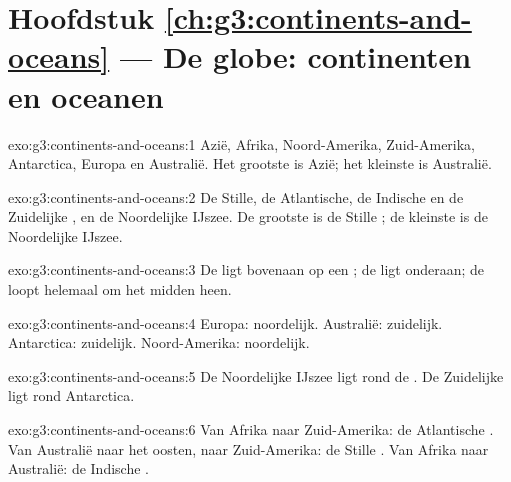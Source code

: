 \section*{Hoofdstuk \ref{ch:g3:continents-and-oceans} --- De globe: continenten en oceanen}

\begin{solution}{exo:g3:continents-and-oceans:1}
Azië, Afrika, Noord-Amerika, Zuid-Amerika, Antarctica, Europa en
Australië. Het grootste is Azië; het kleinste is Australië.
\end{solution}

\begin{solution}{exo:g3:continents-and-oceans:2}
De Stille, de Atlantische, de Indische en de Zuidelijke , en de
Noordelijke IJszee. De grootste is de Stille ; de kleinste is de
Noordelijke IJszee.
\end{solution}

\begin{solution}{exo:g3:continents-and-oceans:3}
De  ligt bovenaan op een ; de  ligt onderaan; de
 loopt helemaal om het midden heen.
\end{solution}

\begin{solution}{exo:g3:continents-and-oceans:4}
Europa: noordelijk. Australië: zuidelijk. Antarctica: zuidelijk.
Noord-Amerika: noordelijk.
\end{solution}

\begin{solution}{exo:g3:continents-and-oceans:5}
De Noordelijke IJszee ligt rond de . De Zuidelijke  ligt
rond Antarctica.
\end{solution}

\begin{solution}{exo:g3:continents-and-oceans:6}
Van Afrika naar Zuid-Amerika: de Atlantische . Van Australië naar
het oosten, naar Zuid-Amerika: de Stille . Van Afrika naar
Australië: de Indische .
\end{solution}

